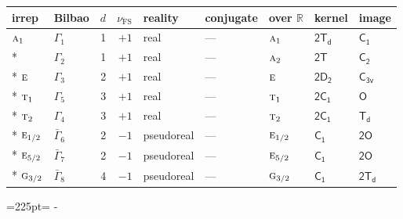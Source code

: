 \documentclass[10pt,a4paper]{article}
\makeatletter
\def\grouprule#1#2{\noalign{\marks\LTgroupmarks{\the\belowrulesep}\nobreak\vskip#1%
  \vskip\aboverulesep}\multispan\LT@cols\unskip{\leaders\hrule\@height#2\hfill\kern\z@}\cr
  \noalign{\penalty\LTrulebreak\vskip\belowrulesep\global\@lastruleclass\z@}}
\newcommand{\needspace}[1]{\par\penalty-100\begingroup\dimen0=#1\relax\dimen2=\pagegoal
  \advance\dimen2-\pagetotal\ifdim\dimen0>\dimen2\relax\ifdim\dimen2>0pt\vfil\break\fi\fi
  \endgroup}
\numberwithin{equation}{section}
\newcommand{\grp}[1]{\mathsf{#1}}
\newcommand{\irr}[1]{\text{\normalfont\scshape #1}}
\newcommand{\detbox}[1]{{\setlength{\fboxsep}{1pt}\fbox{#1}}}
\newcommand{\fsind}{\nu_{\mathrm{FS}}}
\makeatother
\begin{document}
\setlength{\emergencystretch}{2em}\par\setlength{\emergencystretch}{0pt}
{\small\renewcommand{\arraystretch}{1.25}\setlength{\tabcolsep}{4pt}\begin{longtable}{@{}llrrlllll@{}}\toprule
irrep & Bilbao & $d$ & $\fsind$ & reality & conjugate & over $\mathbb{R}$ & kernel & image\\\midrule\endhead
\bottomrule\endfoot\endlastfoot
$\irr{a}_{1}$ & $\Gamma_{1}$ & 1 & $+1$ & real & --- & $\irr{a}_{1}$ & \href{2Td.pdf}{$\grp{2T_{d}}$} & \href{../../../rotation/data/pdf/C1.pdf}{$\grp{C_{1}}$}\\*
\detbox{$\irr{a}_{2}$} & $\Gamma_{2}$ & 1 & $+1$ & real & --- & $\irr{a}_{2}$ & \href{2T.pdf}{$\grp{2T}$} & \href{../../../rotation/data/pdf/C2.pdf}{$\grp{C_{2}}$}\\*
$\irr{e}$ & $\Gamma_{3}$ & 2 & $+1$ & real & --- & $\irr{e}$ & \href{2D2.pdf}{$\grp{2D_{2}}$} & \href{../../../rotation/data/pdf/C3v.pdf}{$\grp{C_{3v}}$}\\*
$\irr{t}_{1}$ & $\Gamma_{5}$ & 3 & $+1$ & real & --- & $\irr{t}_{1}$ & \href{2C1.pdf}{$\grp{2C_{1}}$} & \href{../../../rotation/data/pdf/O.pdf}{$\grp{O}$}\\*
$\irr{t}_{2}$ & $\Gamma_{4}$ & 3 & $+1$ & real & --- & $\irr{t}_{2}$ & \href{2C1.pdf}{$\grp{2C_{1}}$} & \href{../../../rotation/data/pdf/Td.pdf}{$\grp{T_{d}}$}\\*
\grouprule{0pt}{\lightrulewidth}
$\irr{e}_{1/2}$ & $\bar{\Gamma}_{6}$ & 2 & $-1$ & pseudoreal & --- & $\irr{e}_{1/2}$ & \href{C1.pdf}{$\grp{C_{1}}$} & \href{2O.pdf}{$\grp{2O}$}\\*
$\irr{e}_{5/2}$ & $\bar{\Gamma}_{7}$ & 2 & $-1$ & pseudoreal & --- & $\irr{e}_{5/2}$ & \href{C1.pdf}{$\grp{C_{1}}$} & \href{2O.pdf}{$\grp{2O}$}\\*
$\irr{g}_{3/2}$ & $\bar{\Gamma}_{8}$ & 4 & $-1$ & pseudoreal & --- & $\irr{g}_{3/2}$ & \href{C1.pdf}{$\grp{C_{1}}$} & \href{2Td.pdf}{$\grp{2T_{d}}$}\\
\bottomrule\end{longtable}}
\needspace{225pt}
\end{document}
